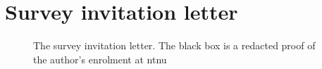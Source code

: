 \chapter{Survey invitation letter}

\begin{figure}[H]
    \centering
    \caption{The survey invitation letter. The black box is a redacted proof of the author's enrolment at \gls{ntnu}}
    \label{fig:letter}
\end{figure}